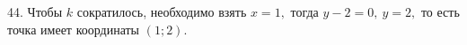 44. Чтобы $k$ сократилось, необходимо взять $x=1,$ тогда $y-2=0,\ y=2,$ то есть точка имеет координаты $(1;2).$\\
